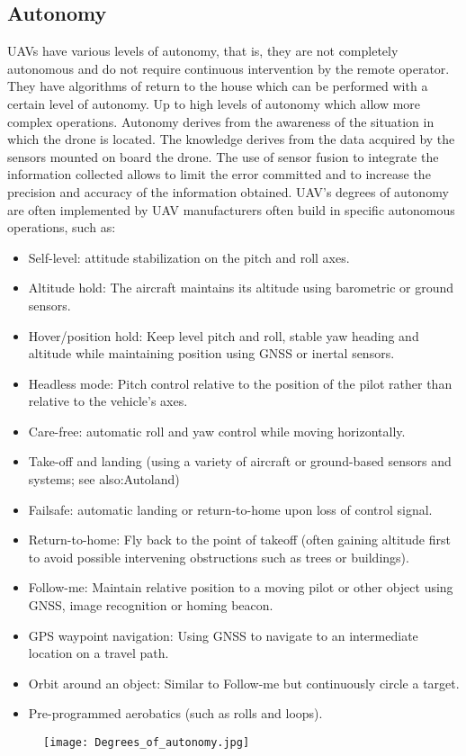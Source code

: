 \subsection{Autonomy}
\label{ssec:autonomy}
%
UAVs have various levels of autonomy, that is, they are not completely
autonomous and do not require continuous intervention by the remote operator.
They have algorithms of return to the house which can be performed with a certain
level of autonomy. 
Up to high levels of autonomy which allow more complex operations. 
Autonomy derives from the awareness of the situation in which the drone is
located. 
The knowledge derives from the data acquired by the sensors mounted on board the
drone. 
The use of sensor fusion to integrate the information collected allows to limit
the error committed and to increase the precision and accuracy of the
information obtained. 
UAV's degrees of autonomy are often implemented by UAV manufacturers often build
in specific autonomous operations, such as:
\begin{itemize}
	\item Self-level: attitude stabilization on the pitch and roll axes.
	\item Altitude hold: The aircraft maintains its altitude using barometric or ground sensors.
	\item Hover/position hold: Keep level pitch and roll, stable yaw heading and altitude while maintaining position using GNSS or inertal sensors.
	\item Headless mode: Pitch control relative to the position of the pilot rather than relative to the vehicle's axes.
	\item Care-free: automatic roll and yaw control while moving horizontally.
	\item Take-off and landing (using a variety of aircraft or ground-based sensors and systems; see also:Autoland)
	\item Failsafe: automatic landing or return-to-home upon loss of control signal.
	\item Return-to-home: Fly back to the point of takeoff (often gaining altitude first to avoid possible intervening obstructions such as trees or buildings).
	\item Follow-me: Maintain relative position to a moving pilot or other object using GNSS, image recognition or homing beacon.
	\item GPS waypoint navigation: Using GNSS to navigate to an intermediate location on a travel path.
	\item Orbit around an object: Similar to Follow-me but continuously circle a target.
	\item Pre-programmed aerobatics (such as rolls and loops).\cite{wiki:uav}
\end{itemize}
%
%
\begin{figure}[htb]
	\centering
    \texttt{[image: Degrees\_of\_autonomy.jpg]}
    \label{fig:uav-autonomy}
\end{figure}
%